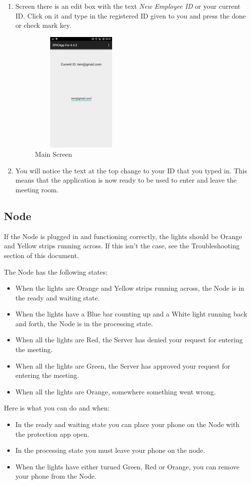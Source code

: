 \documentclass{article}
\begin{document}
\begin{enumerate}
\item{ Screen there is an edit box with the text \textit{New Employee ID} or your current ID. Click on it and type in the registered ID given to you and press the done or check mark key.
\begin{figure}[H]
\center
\includegraphics[width=5cm, height=6cm]{SecOpen}
\caption{Main Screen}
\label{fig:my_label4}
\end{figure}}
\item You will notice the text at the top change to your ID that you typed in. This means that the application is now ready to be used to enter and leave the meeting room.
\end{enumerate}

\subsection{Node}
If the Node is plugged in and functioning correctly, the lights should be Orange and Yellow strips running across. If this isn't the case, see the Troubleshooting section of this document.

The Node has the following states:
\begin{itemize}
\item When the lights are Orange and Yellow strips running across, the Node is in the ready and waiting state.
\item When the lights have a Blue bar counting up and a White light running back and forth, the Node is in the processing state.
\item When all the lights are Red, the Server has denied your request for entering the meeting.
\item When all the lights are Green, the Server has approved your request for entering the meeting.
\item When all the lights are Orange, somewhere something went wrong.
\end{itemize}
Here is what you can do and when:
\begin{itemize}
\item In the ready and waiting state you can place your phone on the Node with the protection app open.
\item In the processing state you must leave your phone on the node.
\item When the lights have either turned Green, Red or Orange, you can remove your phone from the Node.
\end{itemize}
\end{document}

